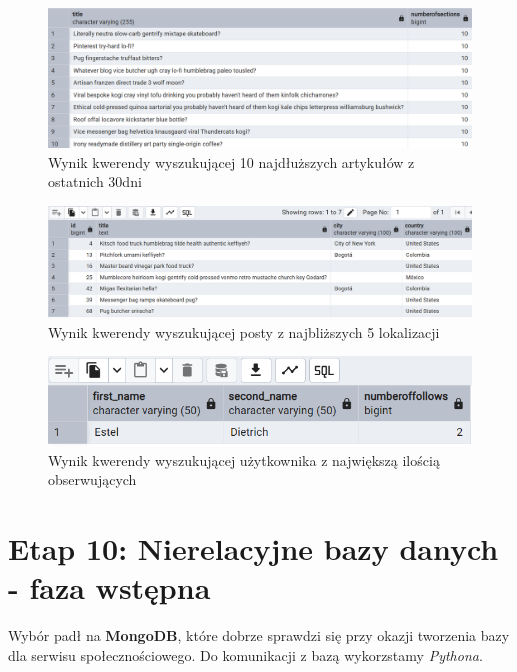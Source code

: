 \documentclass{article}
\begin{document}
\begin{figure}[H]
    \centering
    \includegraphics[width=\textwidth]{docs/images/top_10_longest_articles_from_last_30days.png}
    \caption{Wynik kwerendy wyszukującej 10 najdłuższych artykułów z ostatnich 30dni}
    \label{fig:sql9_1}
\end{figure}

\begin{figure}[H]
    \centering
    \includegraphics[width=\textwidth]{docs/images/post_from_5_nearest_locations.png}
    \caption{Wynik kwerendy wyszukującej posty z najbliższych 5 lokalizacji}
    \label{fig:sql9_2}
\end{figure}

\begin{figure}[H]
    \centering
    \includegraphics[width=\textwidth]{docs/images/user_with_most_follows.png}
    \caption{Wynik kwerendy wyszukującej użytkownika z największą ilością obserwujących}
    \label{fig:sql9_3}
\end{figure}

\section{Etap 10: Nierelacyjne bazy danych - faza wstępna}

Wybór padł na \textbf{MongoDB}, które dobrze sprawdzi się przy okazji tworzenia bazy dla serwisu społecznościowego. Do komunikacji z bazą wykorzstamy \textit{Pythona}.
\end{document}
